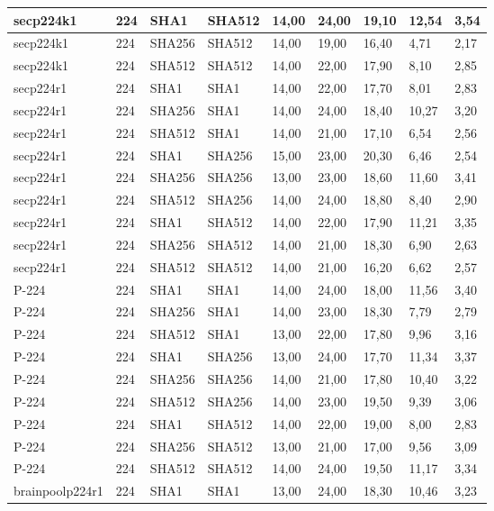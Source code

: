 \begin{longtable}{| l | l | l | l | l |l |l |l |l |}
secp224k1 & 224 & SHA1 & SHA512 & 14,00 & 24,00 & 19,10 & 12,54 & 3,54 \\ \hline 
secp224k1 & 224 & SHA256 & SHA512 & 14,00 & 19,00 & 16,40 & 4,71 & 2,17 \\ \hline 
secp224k1 & 224 & SHA512 & SHA512 & 14,00 & 22,00 & 17,90 & 8,10 & 2,85 \\ \hline 
secp224r1 & 224 & SHA1 & SHA1 & 14,00 & 22,00 & 17,70 & 8,01 & 2,83 \\ \hline 
secp224r1 & 224 & SHA256 & SHA1 & 14,00 & 24,00 & 18,40 & 10,27 & 3,20 \\ \hline 
secp224r1 & 224 & SHA512 & SHA1 & 14,00 & 21,00 & 17,10 & 6,54 & 2,56 \\ \hline 
secp224r1 & 224 & SHA1 & SHA256 & 15,00 & 23,00 & 20,30 & 6,46 & 2,54 \\ \hline 
secp224r1 & 224 & SHA256 & SHA256 & 13,00 & 23,00 & 18,60 & 11,60 & 3,41 \\ \hline 
secp224r1 & 224 & SHA512 & SHA256 & 14,00 & 24,00 & 18,80 & 8,40 & 2,90 \\ \hline 
secp224r1 & 224 & SHA1 & SHA512 & 14,00 & 22,00 & 17,90 & 11,21 & 3,35 \\ \hline 
secp224r1 & 224 & SHA256 & SHA512 & 14,00 & 21,00 & 18,30 & 6,90 & 2,63 \\ \hline 
secp224r1 & 224 & SHA512 & SHA512 & 14,00 & 21,00 & 16,20 & 6,62 & 2,57 \\ \hline 
P-224 & 224 & SHA1 & SHA1 & 14,00 & 24,00 & 18,00 & 11,56 & 3,40 \\ \hline 
P-224 & 224 & SHA256 & SHA1 & 14,00 & 23,00 & 18,30 & 7,79 & 2,79 \\ \hline 
P-224 & 224 & SHA512 & SHA1 & 13,00 & 22,00 & 17,80 & 9,96 & 3,16 \\ \hline 
P-224 & 224 & SHA1 & SHA256 & 13,00 & 24,00 & 17,70 & 11,34 & 3,37 \\ \hline 
P-224 & 224 & SHA256 & SHA256 & 14,00 & 21,00 & 17,80 & 10,40 & 3,22 \\ \hline 
P-224 & 224 & SHA512 & SHA256 & 14,00 & 23,00 & 19,50 & 9,39 & 3,06 \\ \hline 
P-224 & 224 & SHA1 & SHA512 & 14,00 & 22,00 & 19,00 & 8,00 & 2,83 \\ \hline 
P-224 & 224 & SHA256 & SHA512 & 13,00 & 21,00 & 17,00 & 9,56 & 3,09 \\ \hline 
P-224 & 224 & SHA512 & SHA512 & 14,00 & 24,00 & 19,50 & 11,17 & 3,34 \\ \hline 
brainpoolp224r1 & 224 & SHA1 & SHA1 & 13,00 & 24,00 & 18,30 & 10,46 & 3,23 \\ \hline 

\end{longtable}
